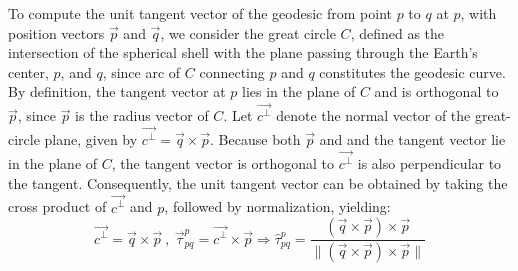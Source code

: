\documentclass[acmsmall, screen]{acmart}
\begin{document}
To compute the unit tangent vector of the geodesic from point $p$ to $q$ at $p$, with position vectors $\vec{p}$ and $\vec{q}$, we consider the great circle $C$, defined as the intersection of the spherical shell with the plane passing through the Earth’s center, $p$, and $q$, since arc of $C$ connecting $p$ and $q$ constitutes the geodesic curve. By definition, the tangent vector at $p$ lies in the plane of $C$ and is orthogonal to $\vec{p}$, since $\vec{p}$ is the radius vector of $C$. Let $\vec{c^{\perp}}$ denote the normal vector of the great-circle plane, given by $\vec{c^{\perp}} = \vec{q} \times \vec{p}$. Because both $\vec{p}$ and and the tangent vector lie in the plane of $C$, the tangent vector is orthogonal to $\vec{c^{\perp}}$ is also perpendicular to the tangent. Consequently, the unit tangent vector can be obtained by taking the cross product of $\vec{c^{\perp}}$ and $p$, followed by normalization, yielding:
\begin{equation}\label{appendix:geomCalc:field:tangent}
    \vec{c^{\perp}} = \vec{q} \times \vec{p} \: , \: \vec{\tau}^{p}_{pq} = \vec{c^{\perp}} \times \vec{p}  \Longrightarrow \hat{\tau}^p_{pq} = \frac{(\vec{q} \times \vec{p}) \times \vec{p}}{\|(\vec{q} \times \vec{p}) \times \vec{p}\|}
\end{equation}
\end{document}
